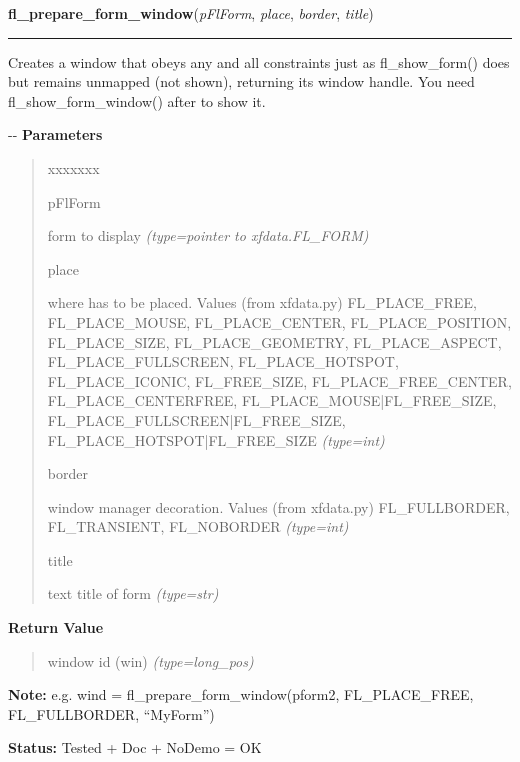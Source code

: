 \hspace{.8\funcindent}\begin{boxedminipage}{\funcwidth}

    \raggedright \textbf{fl\_prepare\_form\_window}(\textit{pFlForm}, \textit{place}, \textit{border}, \textit{title})

    \vspace{-1.5ex}

    \rule{\textwidth}{0.5\fboxrule}
\setlength{\parskip}{2ex}

Creates a window that obeys any and all constraints just as
fl\_show\_form() does but remains unmapped (not shown), returning its
window handle. You need fl\_show\_form\_window() after to show it.

-{}-
\setlength{\parskip}{1ex}
      \textbf{Parameters}
      \vspace{-1ex}

      \begin{quote}
        \begin{Ventry}{xxxxxxx}

          \item[pFlForm]


form to display
            {\it (type=pointer to xfdata.FL\_FORM)}

          \item[place]


where has to be placed. Values (from xfdata.py) FL\_PLACE\_FREE,
FL\_PLACE\_MOUSE, FL\_PLACE\_CENTER, FL\_PLACE\_POSITION, FL\_PLACE\_SIZE,
FL\_PLACE\_GEOMETRY, FL\_PLACE\_ASPECT, FL\_PLACE\_FULLSCREEN,
FL\_PLACE\_HOTSPOT, FL\_PLACE\_ICONIC, FL\_FREE\_SIZE, FL\_PLACE\_FREE\_CENTER,
FL\_PLACE\_CENTERFREE, FL\_PLACE\_MOUSE|FL\_FREE\_SIZE,
FL\_PLACE\_FULLSCREEN|FL\_FREE\_SIZE, FL\_PLACE\_HOTSPOT|FL\_FREE\_SIZE
            {\it (type=int)}

          \item[border]


window manager decoration. Values (from xfdata.py) FL\_FULLBORDER,
FL\_TRANSIENT, FL\_NOBORDER
            {\it (type=int)}

          \item[title]


text title of form
            {\it (type=str)}

        \end{Ventry}

      \end{quote}

      \textbf{Return Value}
    \vspace{-1ex}

      \begin{quote}

window id (win)
      {\it (type=long\_pos)}

      \end{quote}

\textbf{Note:} 
e.g. wind = fl\_prepare\_form\_window(pform2, FL\_PLACE\_FREE,
FL\_FULLBORDER, ``MyForm'')


\textbf{Status:} 
Tested + Doc + NoDemo = OK


    \end{boxedminipage}

